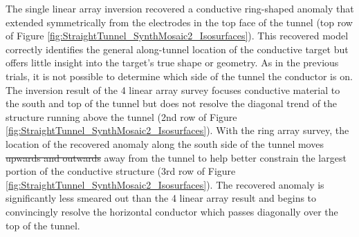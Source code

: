 \documentclass[preprint,authoryear,12pt]{elsarticle}
\providecommand{\DIFaddtex}[1]{{\protect\color{blue}\uwave{#1}}} %
\providecommand{\DIFdeltex}[1]{{\protect\color{red}\sout{#1}}}                      %
\providecommand{\DIFaddbegin}{} %
\providecommand{\DIFaddend}{} %
\providecommand{\DIFdelbegin}{} %
\providecommand{\DIFdelend}{} %
\providecommand{\DIFadd}[1]{\texorpdfstring{\DIFaddtex{#1}}{#1}} %
\providecommand{\DIFdel}[1]{\texorpdfstring{\DIFdeltex{#1}}{}} %
\begin{document}
The single linear array inversion recovered a conductive ring-shaped anomaly that extended symmetrically from the electrodes in the top face of the tunnel (top row of Figure \ref{fig:StraightTunnel_SynthMosaic2_Isosurfaces}). This recovered model correctly identifies the general along-tunnel location of the conductive target but offers little insight into the target's true shape or geometry. As in the previous trials, it is not possible to determine which side of the tunnel the conductor is on. The inversion result of the 4 linear array survey focuses conductive material to the south and top of the tunnel but does not resolve the diagonal trend of the structure running above the tunnel (2nd row of Figure \ref{fig:StraightTunnel_SynthMosaic2_Isosurfaces}). With the ring array survey, the location of the recovered anomaly along the south side of the tunnel moves \DIFdelbegin \DIFdel{upwards and outwards }\DIFdelend \DIFaddbegin \DIFadd{upward and outward }\DIFaddend away from the tunnel to help better constrain the largest portion of the conductive structure (3rd row of Figure \ref{fig:StraightTunnel_SynthMosaic2_Isosurfaces}). The recovered anomaly is significantly less smeared out than the 4 linear array result and begins to convincingly resolve the horizontal conductor which passes diagonally over the top of the tunnel.


\DIFdelbegin %


\end{document}
